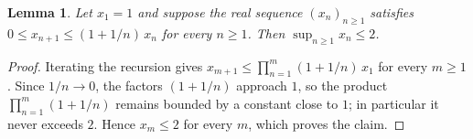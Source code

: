 \documentclass{article}
\newtheorem{lemma}{Lemma}
\begin{document}
\begin{lemma}\label{lem:bounded-drift}
Let $x_1 = 1$ and suppose the real sequence $(x_n)_{n \ge 1}$ satisfies
$0 \le x_{n+1} \le (1 + 1/n)\, x_n$ for every $n \ge 1$.
Then $\sup_{n \ge 1} x_n \le 2$.
\end{lemma}

\begin{proof}
Iterating the recursion gives
$x_{m+1} \le \prod_{n=1}^{m} (1 + 1/n)\, x_1$ for every $m \ge 1$.
Since $1/n \to 0$, the factors $(1 + 1/n)$ approach $1$, so the product
$\prod_{n=1}^{m} (1 + 1/n)$ remains bounded by a constant close to $1$;
in particular it never exceeds $2$.
Hence $x_m \le 2$ for every $m$, which proves the claim.
\end{proof}
\end{document}
